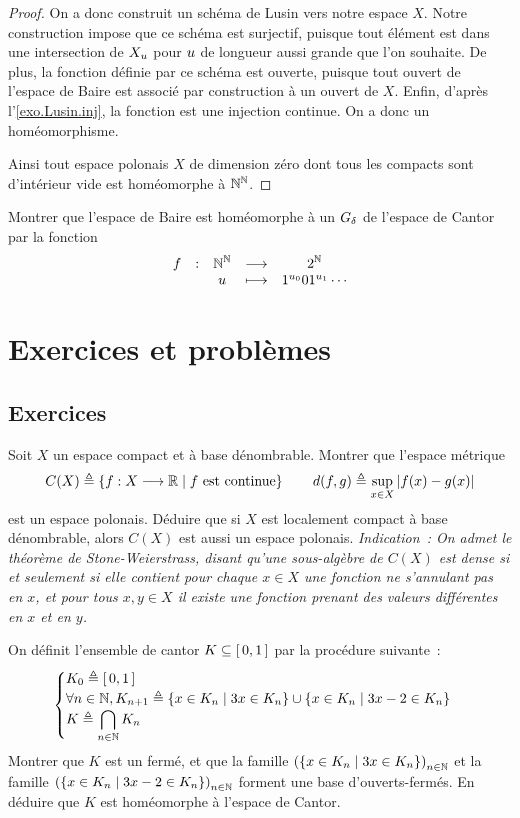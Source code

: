 \begin{proof}
  On a donc construit un schéma de Lusin vers notre espace $X$. Notre
  construction impose que ce schéma est surjectif, puisque tout élément est dans
  une intersection de $X_u$ pour $u$ de longueur aussi grande que l'on
  souhaite. De plus, la fonction définie par ce schéma est ouverte, puisque tout
  ouvert de l'espace de Baire est associé par construction à un ouvert de $X$.
  Enfin, d'après l'\cref{exo.Lusin.inj}, la fonction est une injection continue.
  On a donc un homéomorphisme.

  Ainsi tout espace polonais $X$ de dimension zéro dont tous les compacts sont
  d'intérieur vide est homéomorphe à $\mathbb N^\mathbb N$.
\end{proof}

\begin{exercise}
  Montrer que l'espace de Baire est homéomorphe à un $G_{\delta}$ de l'espace de
  Cantor par la fonction
  \[\makeFun{f}{\bN^\bN}{2^\bN}{u}{1^{u_0}01^{u_1}\cdots}\]
\end{exercise}

\clearpage

\section{Exercices et problèmes}

\subsection{Exercices}

\begin{exercise}
  Soit $X$ un espace compact et à base dénombrable. Montrer que l'espace
  métrique
  \[C(X) \triangleq \left\{ f : \displaystyle X \longrightarrow \mathbb R \;\middle\vert\; f\text{ est continue} \right\}\qquad
  d(f,g) \triangleq \sup_{x \in X} \left\vert f(x) - g(x) \right\vert\]
  est un espace polonais. Déduire que si $X$ est localement compact à base
  dénombrable, alors $C(X)$ est aussi un espace polonais.
  \textit{Indication~: On admet le théorème de Stone-Weierstrass, disant qu'une
    sous-algèbre de $C(X)$ est dense si et seulement si elle contient pour
    chaque $x \in X$ une fonction ne s'annulant pas en $x$, et pour tous
    $x,y \in X$ il existe une fonction prenant des valeurs différentes en
    $x$ et en $y$.}
\end{exercise}

\begin{exercise}
  On définit l'ensemble de cantor $K \subseteq \mathord{\left[\,0,1\,\right]}$ par la procédure
  suivante~:
  \[\begin{cases}
  K_0 \triangleq \mathord{\left[\,0,1\,\right]}\\
  \forall n \in \mathbb N, K_{n+1} \triangleq
  \left\{ x \in K_n \;\middle\vert\; 3x \in K_n \right\}\cup \left\{ x \in K_n \;\middle\vert\; 3x - 2 \in K_n \right\}\\
  K \triangleq \displaystyle\bigcap_{n \in \mathbb N} K_n
  \end{cases}\]
  Montrer que $K$ est un fermé, et que la famille
  $\left(\left\{ x\in K_n \;\middle\vert\; 3x\in K_n \right\}\right)_{n \in \mathbb N}$ et la famille
  $\left(\left\{ x\in K_n \;\middle\vert\; 3x - 2 \in K_n \right\}\right)_{n \in \mathbb N}$ forment une base
  d'ouverts-fermés. En déduire que $K$ est homéomorphe à l'espace de Cantor.
\end{exercise}

